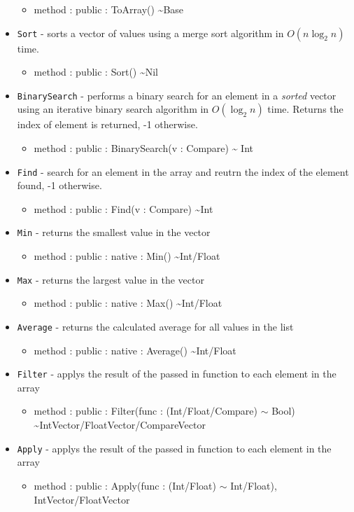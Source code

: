 \documentclass[11pt]{article}
\begin{document}
\begin{itemize}
  \begin{itemize}
  \item method : public : ToArray() \textasciitilde Base
  \end{itemize}
\item \texttt{Sort} - sorts a vector of values using a merge sort
  algorithm in $O(n \log_2 n)$ time.
  \begin{itemize}
  \item method : public : Sort() \textasciitilde Nil
  \end{itemize}
\item \texttt{BinarySearch} - performs a binary search for an element
  in a \emph{sorted} vector using an iterative binary search algorithm
  in $O(\log_2 n)$ time. Returns the index of element is returned, -1
  otherwise.
  \begin{itemize}
  \item method : public : BinarySearch(v : Compare) \textasciitilde
    Int
  \end{itemize}
\item \texttt{Find} - search for an element in the array and reutrn
  the index of the element found, -1 otherwise.
  \begin{itemize}
  \item method : public : Find(v : Compare) \textasciitilde Int
  \end{itemize}
\item \texttt{Min} - returns the smallest value in the vector
  \begin{itemize}
  \item method : public : native : Min() \textasciitilde Int/Float
  \end{itemize}
\item \texttt{Max} - returns the largest value in the vector
  \begin{itemize}
  \item method : public : native : Max() \textasciitilde Int/Float
  \end{itemize}
\item \texttt{Average} - returns the calculated average for all values
  in the list
  \begin{itemize}
  \item method : public : native : Average() \textasciitilde Int/Float
  \end{itemize}
\item \texttt{Filter} - applys the result of the passed in function to
  each element in the array
  \begin{itemize}
  \item method : public : Filter(func : (Int/Float/Compare) $\sim$
    Bool) \textasciitilde IntVector/FloatVector/CompareVector
  \end{itemize}
\item \texttt{Apply} - applys the result of the passed in function to
  each element in the array
  \begin{itemize}
  \item method : public : Apply(func : (Int/Float) $\sim$ Int/Float),
    IntVector/FloatVector
  \end{itemize}
\end{itemize}
\end{document}
